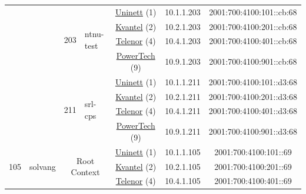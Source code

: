 \begin{small}
\begin{center}
\begin{longtable}{|c|c|c|c|c|c|c|c|}
  &  & \multirow{4}{*}{\tiny{203}} & \multicolumn{1}{|l|}{\multirow{4}{*}{\tiny{ntnu-test}}} & \multicolumn{2}{|c|}{\tiny{\href{https://www.uninett.no}{Uninett} (1)}} & \tiny{10.1.1.203} & \tiny{2001:700:4100:101::cb:68} \\* \cline{5-5}\cline{6-6}\cline{7-7}\cline{8-8}
  &  &  &  & \multicolumn{2}{|c|}{\tiny{\href{http://kvantel.no}{Kvantel} (2)}} & \tiny{10.2.1.203} & \tiny{2001:700:4100:201::cb:68} \\* \cline{5-5}\cline{6-6}\cline{7-7}\cline{8-8}
  &  &  &  & \multicolumn{2}{|c|}{\tiny{\href{https://www.telenor.no}{Telenor} (4)}} & \tiny{10.4.1.203} & \tiny{2001:700:4100:401::cb:68} \\* \cline{5-5}\cline{6-6}\cline{7-7}\cline{8-8}
  &  &  &  & \multicolumn{2}{|c|}{\tiny{\href{http://www.powertech.no}{PowerTech} (9)}} & \tiny{10.9.1.203} & \tiny{2001:700:4100:901::cb:68} \\* \cline{3-3}\cline{4-4}\cline{5-5}\cline{6-6}\cline{7-7}\cline{8-8}
  &  & \multirow{4}{*}{\tiny{211}} & \multicolumn{1}{|l|}{\multirow{4}{*}{\tiny{srl-cps}}} & \multicolumn{2}{|c|}{\tiny{\href{https://www.uninett.no}{Uninett} (1)}} & \tiny{10.1.1.211} & \tiny{2001:700:4100:101::d3:68} \\* \cline{5-5}\cline{6-6}\cline{7-7}\cline{8-8}
  &  &  &  & \multicolumn{2}{|c|}{\tiny{\href{http://kvantel.no}{Kvantel} (2)}} & \tiny{10.2.1.211} & \tiny{2001:700:4100:201::d3:68} \\* \cline{5-5}\cline{6-6}\cline{7-7}\cline{8-8}
  &  &  &  & \multicolumn{2}{|c|}{\tiny{\href{https://www.telenor.no}{Telenor} (4)}} & \tiny{10.4.1.211} & \tiny{2001:700:4100:401::d3:68} \\* \cline{5-5}\cline{6-6}\cline{7-7}\cline{8-8}
  &  &  &  & \multicolumn{2}{|c|}{\tiny{\href{http://www.powertech.no}{PowerTech} (9)}} & \tiny{10.9.1.211} & \tiny{2001:700:4100:901::d3:68} \\ \hline
 \multirow{56}{*}{\tiny{105}} & \multicolumn{1}{|l|}{\multirow{56}{*}{\tiny{solvang}}} & \multicolumn{2}{|c|}{\multirow{4}{*}{\tiny{Root Context}}} & \multicolumn{2}{|c|}{\tiny{\href{https://www.uninett.no}{Uninett} (1)}} & \tiny{10.1.1.105} & \tiny{2001:700:4100:101::69} \\* \cline{5-5}\cline{6-6}\cline{7-7}\cline{8-8}
  &  & \multicolumn{2}{|c|}{} & \multicolumn{2}{|c|}{\tiny{\href{http://kvantel.no}{Kvantel} (2)}} & \tiny{10.2.1.105} & \tiny{2001:700:4100:201::69} \\* \cline{5-5}\cline{6-6}\cline{7-7}\cline{8-8}
  &  & \multicolumn{2}{|c|}{} & \multicolumn{2}{|c|}{\tiny{\href{https://www.telenor.no}{Telenor} (4)}} & \tiny{10.4.1.105} & \tiny{2001:700:4100:401::69} \\* \cline{5-5}\cline{6-6}\cline{7-7}\cline{8-8}

\end{longtable}
\end{center}
\end{small}
